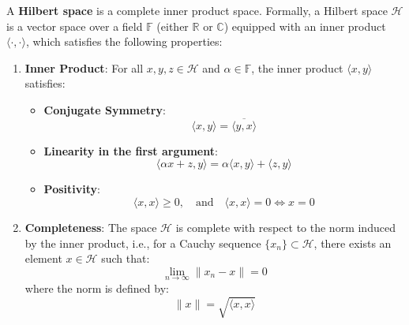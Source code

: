 A \textbf{Hilbert space} is a complete inner product space. Formally, a Hilbert space \( \mathcal{H} \) is a vector space over a field \( \mathbb{F} \) (either \( \mathbb{R} \) or \( \mathbb{C} \)) equipped with an inner product \( \langle \cdot, \cdot \rangle \), which satisfies the following properties:

\begin{enumerate}
    \item \textbf{Inner Product}: For all \( x, y, z \in \mathcal{H} \) and \( \alpha \in \mathbb{F} \), the inner product \( \langle x, y \rangle \) satisfies:
    \begin{itemize}
        \item \textbf{Conjugate Symmetry}:
        \[
        \langle x, y \rangle = \overline{\langle y, x \rangle}
        \]
        \item \textbf{Linearity in the first argument}:
        \[
        \langle \alpha x + z, y \rangle = \alpha \langle x, y \rangle + \langle z, y \rangle
        \]
        \item \textbf{Positivity}:
        \[
        \langle x, x \rangle \geq 0, \quad \text{and} \quad \langle x, x \rangle = 0 \iff x = 0
        \]
    \end{itemize}
    
    \item \textbf{Completeness}: The space \( \mathcal{H} \) is complete with respect to the norm induced by the inner product, i.e., for a Cauchy sequence \( \{x_n\} \subset \mathcal{H} \), there exists an element \( x \in \mathcal{H} \) such that:
    \[
    \lim_{n \to \infty} \|x_n - x\| = 0
    \]
    where the norm is defined by:
    \[
    \|x\| = \sqrt{\langle x, x \rangle}
    \]
\end{enumerate}

